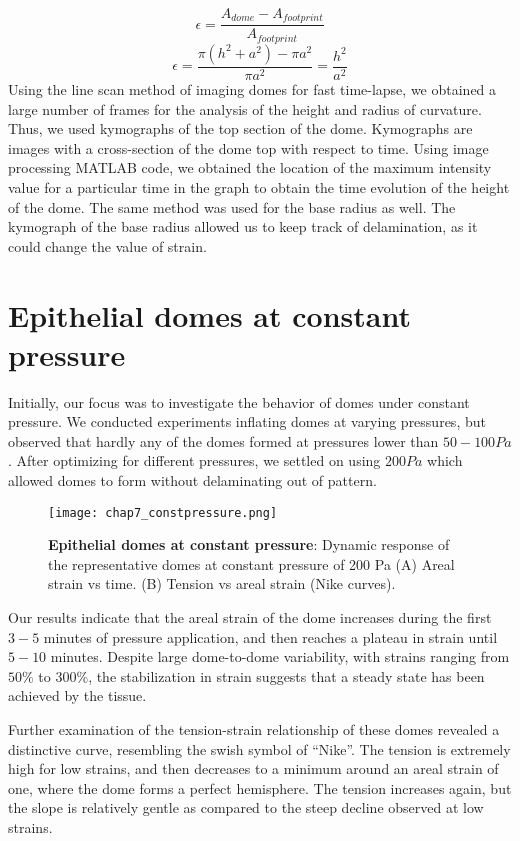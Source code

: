 \[ \epsilon = \frac{A_{dome } - A_{footprint}}{A_{footprint}} \]
\[ \epsilon = \frac{\pi(h^2 + a^2) - \pi a^2}{\pi a^2} = \frac{h^2}{a^2}\]
Using the line scan method of imaging domes for fast time-lapse, we
obtained a large number of frames for the analysis of the height and
radius of curvature. Thus, we used kymographs of the top section of the
dome. Kymographs are images with a cross-section of the dome top with
respect to time. Using image processing MATLAB code, we obtained the
location of the maximum intensity value for a particular time in the
graph to obtain the time evolution of the height of the dome. The same
method was used for the base radius as well. The kymograph of the base
radius allowed us to keep track of delamination, as it could change the
value of strain.

\hypertarget{epithelial-domes-at-constant-pressure}{%
	\section{Epithelial domes at constant
		pressure}\label{epithelial-domes-at-constant-pressure}}

Initially, our focus was to investigate the behavior of domes under
constant pressure. We conducted experiments inflating domes at varying
pressures, but observed that hardly any of the domes formed at pressures
lower than \(50-100 Pa\). After optimizing for different pressures, we
settled on using \(200 Pa\) which allowed domes to form without
delaminating out of pattern.

\begin{figure}
	\centering
	\texttt{[image: chap7\_constpressure.png]}
	\caption{\label{fig_7_3} \textbf{Epithelial domes at constant pressure}: Dynamic response of the representative domes at constant pressure of 200 Pa (A) Areal strain vs time. (B) Tension vs areal strain (Nike curves).
	}
\end{figure}

Our results indicate that the areal strain of the dome increases during
the first \(3-5\) minutes of pressure application, and then reaches a
plateau in strain until \(5-10\) minutes. Despite large dome-to-dome
variability, with strains ranging from \(50\%\) to \(300\%\), the
stabilization in strain suggests that a steady state has been achieved
by the tissue.

Further examination of the tension-strain relationship of these domes
revealed a distinctive curve, resembling the swish symbol of ``Nike''.
The tension is extremely high for low strains, and then decreases to a
minimum around an areal strain of one, where the dome forms a perfect
hemisphere. The tension increases again, but the slope is relatively
gentle as compared to the steep decline observed at low strains.


